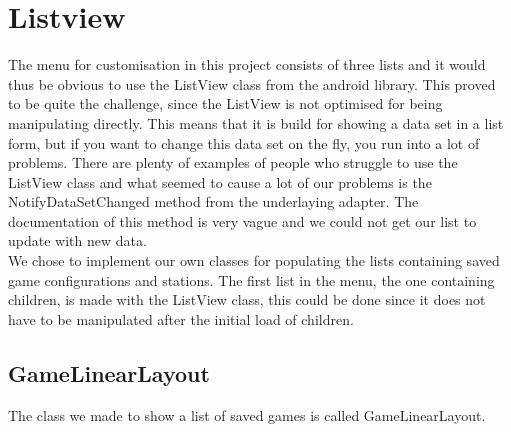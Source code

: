 \section{Listview}
The menu for customisation in this project consists of three lists and it would thus be obvious to use the ListView class from the android library\citep{androidlistview}. This proved to be quite the challenge, since the ListView is not optimised for being manipulating directly. This means that it is build for showing a data set in a list form, but if you want to change this data set on the fly, you run into a lot of problems. There are plenty of examples of people who struggle to use the ListView class\citep{listviewfail} and what seemed to cause a lot of our problems is the NotifyDataSetChanged method from the underlaying adapter\citep{notifydatasetchanged}. The documentation of this method is very vague and we could not get our list to update with new data.\\
We chose to implement our own classes for populating the lists containing saved game configurations and stations. The first list in the menu, the one containing children, is made with the ListView class, this could be done since it does not have to be manipulated after the initial load of children.
\subsection*{GameLinearLayout}
The class we made to show a list of saved games is called GameLinearLayout.\\

